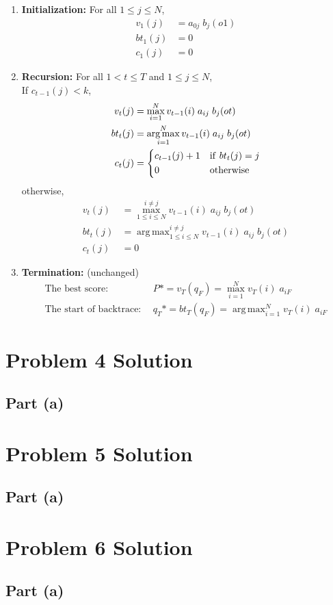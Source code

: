 \documentclass[11pt,a4paper,titlepage]{article}
\DeclareMathOperator*{\argmax}{arg\,max} %
\begin{document}
\begin{enumerate}
    \item \textbf{Initialization:} For all $1 \le j \le N$,
        \begin{align*}
            v_1(j) &= a_{0j} \; b_j(o1) \\
            bt_1(j) &= 0 \\
            c_1(j) &= 0
        \end{align*}
    \item \textbf{Recursion:} For all $1 < t \le T$ and $1 \le j \le N$,\\
        If $c_{t-1}(j) < k$,
        \begin{align*}
            v_t(j) &= \max_{i=1}^{N} v_{t-1}(i) \; a_{ij} \; b_j(ot) \\
            bt_t(j) &= \argmax_{i=1}^{N} v_{t-1}(i) \; a_{ij} \; b_j(ot) \\
            c_t(j) &=
            \begin{dcases}
                c_{t-1}(j) + 1 & {\rm if~} bt_t(j) = j \\
                0 & {\rm otherwise} \\
            \end{dcases}
        \end{align*}
        otherwise,
        \begin{align*}
            v_t(j) &= \max_{1 \le i \le N}^{i \ne j} v_{t-1}(i) \; a_{ij} \; b_j(ot) \\
            bt_t(j) &= \argmax_{1 \le i \le N}^{i \ne j} v_{t-1}(i) \; a_{ij} \; b_j(ot) \\
            c_t(j) &= 0
        \end{align*}
    \item \textbf{Termination:} (unchanged)
        \begin{align*}
            \textrm{The best score:}&~~ P* = v_T(q_F) = \max_{i=1}^N v_T(i) \; a_{iF} \\
            \textrm{The start of backtrace:}&~~ q_T* = bt_T(q_F) = \argmax_{i=1}^N v_T(i) \; a_{iF}
        \end{align*}
\end{enumerate}


\section*{Problem 4 Solution}
\subsection*{Part (a)}

\section*{Problem 5 Solution}
\subsection*{Part (a)}

\section*{Problem 6 Solution}
\subsection*{Part (a)}
\end{document}
